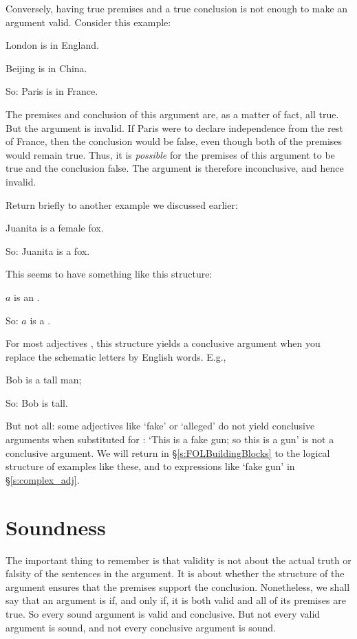 Conversely, having true premises and a true conclusion is not enough to make an argument valid. Consider this example:
	\begin{earg}
		\item[] London is in England.
		\item[] Beijing is in China.
		\item[So:] Paris is in France.
	\end{earg}
The premises and conclusion of this argument are, as a matter of fact, all true. But the argument is invalid. If Paris were to declare independence from the rest of France, then the conclusion would be false, even though both of the premises would remain true. Thus, it is \emph{possible} for the premises of this argument to be true and the conclusion false. The argument is therefore inconclusive, and hence invalid.

Return briefly to another example we discussed earlier: \begin{earg}
 		\item[] Juanita is a female fox.
 		\item[So:] Juanita is a fox.
 	\end{earg} This seems to have something like this structure:
\begin{earg}
 		\item[] $a$ is an \; .
 		\item[So:] $a$ is a .
 	\end{earg} For most adjectives , this structure yields a conclusive argument when you replace the schematic letters by English words. E.g., \begin{earg}
 		\item[] Bob is a tall man;
 		\item[So:] Bob is tall.
 	\end{earg} But not all: some adjectives like `fake' or `alleged' do not yield conclusive arguments when substituted for : `This is a fake gun; so this is a gun' is not a conclusive argument. We will return in §\ref{s:FOLBuildingBlocks} to the logical structure of examples like these, and to expressions like `fake gun' in §\ref{s:complex_adj}.


\section{Soundness}\label{s:sound}

The important thing to remember is that validity is not about the actual truth or falsity of the sentences in the argument. It is about whether the structure of the argument ensures that the premises support the conclusion. Nonetheless, we shall say that an argument is  if, and only if, it is both valid and all of its premises are true. So every sound argument is valid and conclusive. But not every valid argument is sound, and not every conclusive argument is sound.

